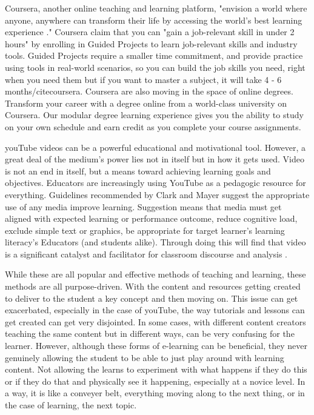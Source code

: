 		Coursera, another online teaching and learning platform, "envision a world where anyone, anywhere can transform their life by accessing the world's best learning experience \cite{coursera}." Coursera claim that you can "gain a job-relevant skill in under 2 hours" by enrolling in Guided Projects to learn job-relevant skills and industry tools. Guided Projects require a smaller time commitment, and provide practice using tools in real-world scenarios, so you can build the job skills you need, right when you need them but if you want to master a subject, it will take 4 - 6 months/cite{coursera}. Coursera are also moving in the space of online degrees. Transform your career with a degree online from a world-class university on Coursera. Our modular degree learning experience gives you the ability to study on your own schedule and earn credit as you complete your course assignments. 
		
		youTube videos can be a powerful educational and motivational tool. However, a great deal of the medium's power lies not in itself but in how it gets used. Video is not an end in itself, but a means toward achieving learning goals and objectives. Educators are increasingly using YouTube as a pedagogic resource for everything. Guidelines recommended by Clark and Mayer \cite{clark2016learning} suggest the appropriate use of any media improve learning. Suggestion means that media must get aligned with expected learning or performance outcome, reduce cognitive load, exclude simple text or graphics, be appropriate for target learner's learning literacy's Educators (and students alike). Through doing this will find that video is a significant catalyst and facilitator for classroom discourse and analysis \cite{duffy2008engaging}.
		
		While these are all popular and effective methods of teaching and learning, these methods are all purpose-driven. With the content and resources getting created to deliver to the student a key concept and then moving on. This issue can get exacerbated, especially in the case of youTube, the way tutorials and lessons can get created can get very disjointed. In some cases, with different content creators teaching the same content but in different ways, can be very confusing for the learner. However, although these forms of e-learning can be beneficial, they never genuinely allowing the student to be able to just play around with learning content. Not allowing the learns to experiment with what happens if they do this or if they do that and physically see it happening, especially at a novice level. In a way, it is like a conveyer belt, everything moving along to the next thing, or in the case of learning, the next topic.
		
